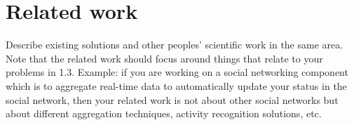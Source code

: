 \section{Related work}
Describe existing solutions and other peoples' scientific work in the same area. Note that the related work should focus around things that relate to your problems in 1.3. Example: if you are working on a social networking component which is to aggregate real-time data to automatically update your status in the social network, then your related work is not about other social networks but about different aggregation techniques, activity recognition solutions, etc.